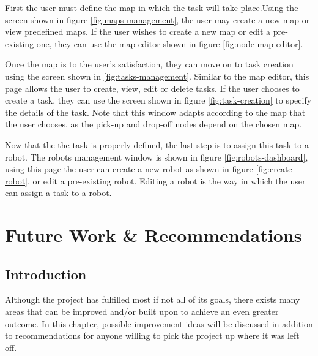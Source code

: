 First the user must define the map in which the task will take place.Using the screen shown in figure \ref{fig:maps-management}, the user may create a new map or view predefined maps. If the user wishes to create a new map or edit a pre-existing one, they can use the map editor shown in figure \ref{fig:node-map-editor}.

Once the map is to the user's satisfaction, they can move on to task creation using the screen shown in \ref{fig:tasks-management}. Similar to the map editor, this page allows the user to create, view, edit or delete tasks. If the user chooses to create a task, they can use the screen shown in figure \ref{fig:task-creation} to specify the details of the task. Note that this window adapts according to the map that the user chooses, as the pick-up and drop-off nodes depend on the chosen map.

Now that the the task is properly defined, the last step is to assign this task to a robot. The robots management window is shown in figure \ref{fig:robots-dashboard}, using this page the user can create a new robot as shown in figure \ref{fig:create-robot}, or edit a pre-existing robot. Editing a robot is the way in which the user can assign a task to a robot.
\newpage

\chapter{Future Work \& Recommendations}


\section{Introduction}
Although the project has fulfilled most if not all of its goals, there exists many areas that can be improved and/or built upon to achieve an even greater outcome. In this chapter, possible improvement ideas will be discussed in addition to recommendations for anyone willing to pick the project up where it was left off.
